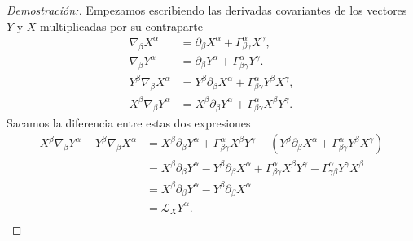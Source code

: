 \begin{proof}[Demostración:]
    Empezamos escribiendo las derivadas covariantes de los vectores $Y$ y $X$ multiplicadas por su contraparte
    \begin{align*}
        \nabla_\beta X^\alpha         & =\partial_\beta X^\alpha+\Gamma_{\beta \gamma}^\alpha X^\gamma ,                  \\
        \nabla_\beta Y^\alpha         & =\partial_\beta Y^\alpha+\Gamma_{\beta \gamma}^\alpha Y^\gamma .                  \\
        Y^\beta \nabla_\beta X^\alpha & =Y^\beta \partial_\beta X^\alpha+\Gamma_{\beta \gamma}^\alpha Y^\beta X^\gamma  , \\
        X^\beta \nabla_\beta Y^\alpha & =X^\beta \partial_\beta Y^\alpha+\Gamma_{\beta \gamma}^\alpha X^\beta Y^\gamma.
    \end{align*}
    Sacamos la diferencia entre estas dos expresiones
    \begin{equation}
        \begin{aligned}
            X^\beta \nabla_\beta Y^\alpha  - Y^\beta \nabla_\beta X^\alpha & = X^\beta \partial_\beta Y^\alpha+\Gamma_{\beta \gamma}^\alpha X^\beta Y^\gamma- (Y^\beta \partial_\beta X^\alpha+\Gamma_{\beta \gamma}^\alpha Y^\beta X^\gamma )   \\
                                                                           & = X^\beta \partial_\beta Y^\alpha - Y^\beta \partial_\beta X^\alpha+\Gamma_{\beta \gamma}^\alpha  X^\beta Y^\gamma -\Gamma_{ \gamma \beta}^\alpha Y^\gamma  X^\beta \\
                                                                           & =X^\beta \partial_\beta Y^\alpha - Y^\beta \partial_\beta X^\alpha                                                                                                  \\
                                                                           & = \mathscr{L}_X Y^\alpha .                                                                                                                                          \\
        \end{aligned}
    \end{equation}
\end{proof}

